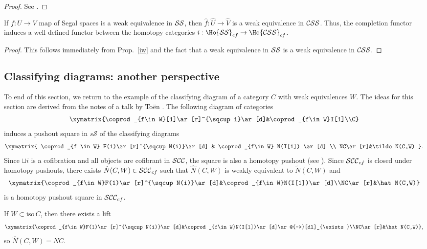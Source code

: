 \begin{proof}
See \cite[Sec.~14]{rezk}.
\end{proof}

\begin{cor}
If $f:U\to V$ map of Segal spaces is a weak equivalence in ${\cal SS}$, then $\hat f:\hat U\to\hat V$ is a weak equivalence in ${\cal CSS}$. Thus, the completion functor induces a well-defined functor between the homotopy categories $i:\Ho{\cal SS}_{cf}\to\Ho{\cal CSS}_{cf}$.
\end{cor}
\begin{proof}
This follows immediately from Prop.~\ref{iw} and the fact that a weak equivalence in ${\cal SS}$ is a weak equivalence in ${\cal CSS}$.
\end{proof}

\subsection{Classifying diagrams: another perspective}\label{sslocal}
To end of this section, we return to the example of the classifying diagram of a category $C$ with weak equivalences $W$. The ideas for this section are derived from the notes of a talk by To\"en \cite{toentalksegal}. The following diagram of categories
\begin{equation} \label{seglocalpushout}
\xymatrix{\coprod_{f\in W}[1]\ar[r]^{\sqcup i}\ar[d]&\coprod_{f\in W}I[1]\\C}
\end{equation}
induces a pushout square in $s\mathcal S$ of the classifying diagrams
\[
\xymatrix{
\coprod_{f \in W} F(1)\ar[r]^{\sqcup N(i)}\ar[d] & \coprod_{f\in W} N(I[1]) \ar[d] \\ NC\ar[r]&\tilde N(C,W)
}.
\]
Since $\sqcup i$ is a cofibration and all objects are cofibrant in ${\cal SCC}$, the square is also a homotopy pushout (see \cite[Prop A.2.2.4]{htt}). Since ${\cal SCC}_{cf}$ is closed under homotopy pushouts, there exists $\hat N(C,W)\in{\cal SCC}_{cf}$ such that $\hat N(C,W)$ is weakly equivalent to $\tilde N(C,W)$ and
$$\xymatrix{\coprod_{f\in W}F(1)\ar[r]^{\sqcup N(i)}\ar[d]&\coprod_{f\in W}N(I[1])\ar[d]\\NC\ar[r]&\hat N(C,W)}$$
is a homotopy pushout square in ${\cal SCC}_{cf}$.

If $W\subset\mathrm{iso}\,C$, then there exists a lift
$$\xymatrix{\coprod_{f\in W}F(1)\ar[r]^{\sqcup N(i)}\ar[d]&\coprod_{f\in W}N(I[1])\ar[d]\ar@{-->}[dl]_{\exists}\\NC\ar[r]&\hat N(C,W)},$$
so $\hat N(C,W)=NC$.

